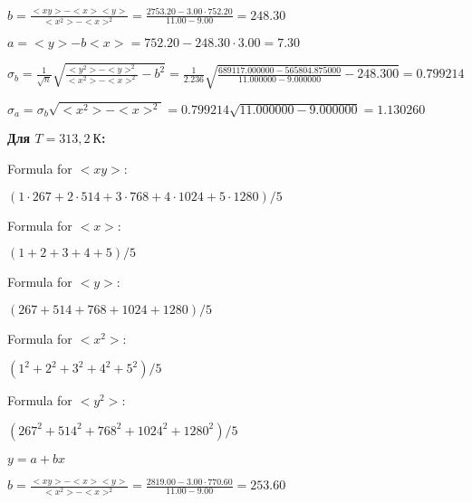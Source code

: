\documentclass[12pt,a4paper]{article}
\begin{document}
$b = \frac{<xy> - <x><y>}{<x^2> - <x>^2} = \frac{2753.20 - 3.00 \cdot 752.20}{11.00 - 9.00} = 248.30$
\vspace{0.5cm}

$a =<y> - b<x> = 752.20 - 248.30 \cdot 3.00 = 7.30$
\vspace{0.5cm}

$\sigma_b = \frac{1}{\sqrt{n}} \sqrt { \frac{<y^2> - <y>^2}{<x^2> - <x>^2}  - b^2} = \frac{1}{2.236} \sqrt {\frac{689117.000000 - 565804.875000}{11.000000 - 9.000000} - 248.300} = 0.799214$
\vspace{0.5cm}

$\sigma_a = \sigma_b \sqrt{<x^2> - <x>^2} = 0.799214 \sqrt{11.000000 - 9.000000} = 1.130260$
\vspace{0.5cm}



\textbf{Для $T = 313,2 \: \textit{К}$:}
\vspace{0.5cm}



Formula for $<xy>:$
\vspace{0.5cm}

$(1 \cdot 267 + 2 \cdot 514 + 3 \cdot 768 + 4 \cdot 1024 + 5 \cdot 1280) / 5$
\vspace{0.5cm}

Formula for $<x>:$
\vspace{0.5cm}

$(1 + 2 + 3 + 4 + 5) / 5$
\vspace{0.5cm}

Formula for $<y>:$
\vspace{0.5cm}

$(267 + 514 + 768 + 1024 + 1280) / 5$
\vspace{0.5cm}

Formula for $<x^2>$:
\vspace{0.5cm}

$(1^2 + 2^2 + 3^2 + 4^2 + 5^2) / 5$
\vspace{0.5cm}

Formula for $<y^2>:$
\vspace{0.5cm}

$(267^2 + 514^2 + 768^2 + 1024^2 + 1280^2) / 5$
\vspace{0.5cm}



$y = a + bx$
\vspace{0.5cm}

$b = \frac{<xy> - <x><y>}{<x^2> - <x>^2} = \frac{2819.00 - 3.00 \cdot 770.60}{11.00 - 9.00} = 253.60$
\vspace{0.5cm}
\end{document}
